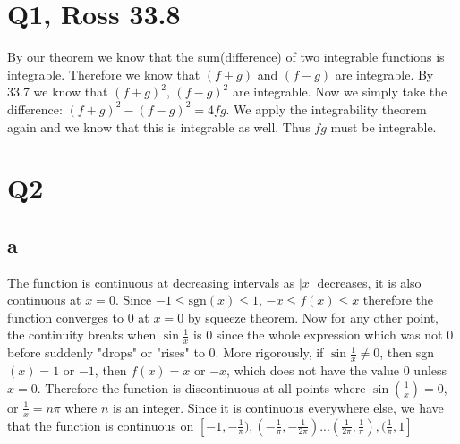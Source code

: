 \documentclass[12pt]{article}
\begin{document}
\section{Q1, Ross 33.8}
By our theorem we know that the sum(difference) of two integrable functions is integrable. Therefore we know that $(f+g)$ and $(f-g)$ are integrable. By 33.7 we know that $(f+g)^2$, $(f-g)^2$ are integrable. Now we simply take the difference: $(f+g)^2-(f-g)^2 = 4fg$. We apply the integrability theorem again and we know that this is integrable as well. Thus $fg$ must be integrable.
\newpage

\section{Q2}
\subsection{a}
The function is continuous at decreasing intervals as $|x|$ decreases, it is also continuous at $x=0$. Since $-1 \leq \text{sgn}(x) \leq 1$, $-x \leq f(x)\leq x$ therefore the function converges to $0$ at $x=0$ by squeeze theorem.
\newline
Now for any other point, the continuity breaks when $\sin \frac{1}{x}$ is 0 since the whole expression which was not 0 before suddenly "drops" or "rises" to 0. More rigorously, if $\sin \frac{1}{x} \not = 0$, then sgn$(x)=1$ or $-1$, then $f(x)=x$ or $-x$, which does not have the value $0$ unless $x=0$. Therefore the function is discontinuous at all points where $\sin(\frac{1}{x})=0$, or $\frac{1}{x} = n \pi$ where $n$ is an integer.
Since it is continuous everywhere else, we have that the function is continuous on $[-1,-\frac{1}{\pi}), (-\frac{1}{\pi},-\frac{1}{2\pi})... (\frac{1}{2\pi},\frac{1}{\pi}), (\frac{1}{\pi},1]$
\end{document}
